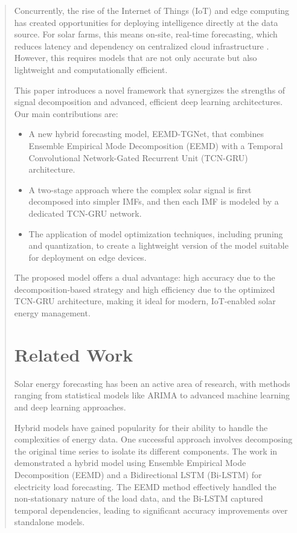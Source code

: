 \documentclass{article}
\begin{document}
\begin{abstract}
Concurrently, the rise of the Internet of Things (IoT) and edge computing has created opportunities for deploying intelligence directly at the data source. For solar farms, this means on-site, real-time forecasting, which reduces latency and dependency on centralized cloud infrastructure \cite{paper2}. However, this requires models that are not only accurate but also lightweight and computationally efficient.

This paper introduces a novel framework that synergizes the strengths of signal decomposition and advanced, efficient deep learning architectures. Our main contributions are:
\begin{itemize}
    \item A new hybrid forecasting model, EEMD-TGNet, that combines Ensemble Empirical Mode Decomposition (EEMD) with a Temporal Convolutional Network-Gated Recurrent Unit (TCN-GRU) architecture.
    \item A two-stage approach where the complex solar signal is first decomposed into simpler IMFs, and then each IMF is modeled by a dedicated TCN-GRU network.
    \item The application of model optimization techniques, including pruning and quantization, to create a lightweight version of the model suitable for deployment on edge devices.
\end{itemize}

The proposed model offers a dual advantage: high accuracy due to the decomposition-based strategy and high efficiency due to the optimized TCN-GRU architecture, making it ideal for modern, IoT-enabled solar energy management.

\section{Related Work}
Solar energy forecasting has been an active area of research, with methods ranging from statistical models like ARIMA to advanced machine learning and deep learning approaches.

Hybrid models have gained popularity for their ability to handle the complexities of energy data. One successful approach involves decomposing the original time series to isolate its different components. The work in \cite{paper1} demonstrated a hybrid model using Ensemble Empirical Mode Decomposition (EEMD) and a Bidirectional LSTM (Bi-LSTM) for electricity load forecasting. The EEMD method effectively handled the non-stationary nature of the load data, and the Bi-LSTM captured temporal dependencies, leading to significant accuracy improvements over standalone models.


\end{abstract}
\end{document}
